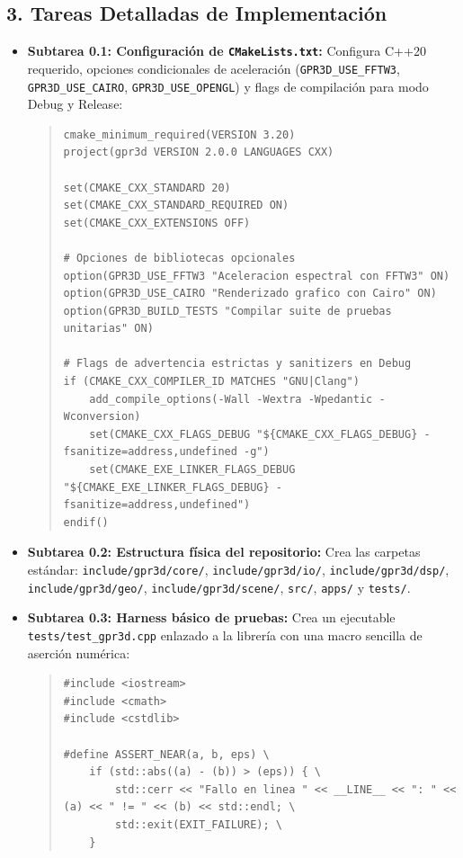 \documentclass[11pt,a4paper]{article}
\begin{document}
\subsection{3. Tareas Detalladas de Implementación}
\begin{itemize}
    \item \textbf{Subtarea 0.1: Configuración de \texttt{CMakeLists.txt}:}
    Configura C++20 requerido, opciones condicionales de aceleración (\texttt{GPR3D\_USE\_FFTW3}, \texttt{GPR3D\_USE\_CAIRO}, \texttt{GPR3D\_USE\_OPENGL}) y flags de compilación para modo Debug y Release:
\begin{quote}
\small
\begin{verbatim}
cmake_minimum_required(VERSION 3.20)
project(gpr3d VERSION 2.0.0 LANGUAGES CXX)

set(CMAKE_CXX_STANDARD 20)
set(CMAKE_CXX_STANDARD_REQUIRED ON)
set(CMAKE_CXX_EXTENSIONS OFF)

# Opciones de bibliotecas opcionales
option(GPR3D_USE_FFTW3 "Aceleracion espectral con FFTW3" ON)
option(GPR3D_USE_CAIRO "Renderizado grafico con Cairo" ON)
option(GPR3D_BUILD_TESTS "Compilar suite de pruebas unitarias" ON)

# Flags de advertencia estrictas y sanitizers en Debug
if (CMAKE_CXX_COMPILER_ID MATCHES "GNU|Clang")
    add_compile_options(-Wall -Wextra -Wpedantic -Wconversion)
    set(CMAKE_CXX_FLAGS_DEBUG "${CMAKE_CXX_FLAGS_DEBUG} -fsanitize=address,undefined -g")
    set(CMAKE_EXE_LINKER_FLAGS_DEBUG "${CMAKE_EXE_LINKER_FLAGS_DEBUG} -fsanitize=address,undefined")
endif()
\end{verbatim}
\end{quote}

    \item \textbf{Subtarea 0.2: Estructura física del repositorio:}
    Crea las carpetas estándar:
    \texttt{include/gpr3d/core/}, \texttt{include/gpr3d/io/}, \texttt{include/gpr3d/dsp/}, \texttt{include/gpr3d/geo/}, \texttt{include/gpr3d/scene/}, \texttt{src/}, \texttt{apps/} y \texttt{tests/}.
    
    \item \textbf{Subtarea 0.3: Harness básico de pruebas:}
    Crea un ejecutable \texttt{tests/test\_gpr3d.cpp} enlazado a la librería con una macro sencilla de aserción numérica:
\begin{quote}
\small
\begin{verbatim}
#include <iostream>
#include <cmath>
#include <cstdlib>

#define ASSERT_NEAR(a, b, eps) \
    if (std::abs((a) - (b)) > (eps)) { \
        std::cerr << "Fallo en linea " << __LINE__ << ": " << (a) << " != " << (b) << std::endl; \
        std::exit(EXIT_FAILURE); \
    }
\end{verbatim}
\end{quote}
\end{itemize}
\end{document}
